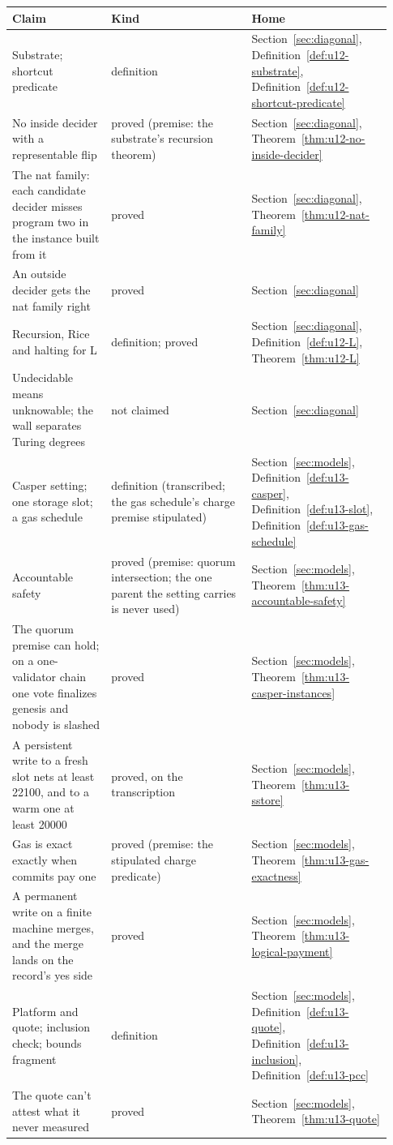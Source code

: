 \documentclass[11pt,twoside]{article}
\theoremstyle{thielethm}
\theoremstyle{thieledef}
\theoremstyle{thieledef}
\theoremstyle{thieledef}
\theoremstyle{thielethm}
\theoremstyle{thieleobs}
\theoremstyle{thielethm}
\begin{document}
\begingroup\small
\begin{longtable}{@{}>{\raggedright\arraybackslash}p{0.242\linewidth}>{\raggedright\arraybackslash}p{0.344\linewidth}>{\raggedright\arraybackslash}p{0.344\linewidth}@{}}
\toprule
\textbf{Claim} & \textbf{Kind} & \textbf{Home} \\
\midrule
\endhead
\bottomrule
\endlastfoot
Substrate; shortcut predicate & definition & Section~\ref{sec:diagonal}, Definition~\ref{def:u12-substrate}, Definition~\ref{def:u12-shortcut-predicate} \\
No inside decider with a representable flip & proved (premise: the substrate's recursion theorem) & Section~\ref{sec:diagonal}, Theorem~\ref{thm:u12-no-inside-decider} \\
The nat family: each candidate decider misses program two in the instance built from it & proved & Section~\ref{sec:diagonal}, Theorem~\ref{thm:u12-nat-family} \\
An outside decider gets the nat family right & proved  & Section~\ref{sec:diagonal} \\
Recursion, Rice and halting for L & definition; proved & Section~\ref{sec:diagonal}, Definition~\ref{def:u12-L}, Theorem~\ref{thm:u12-L} \\
Undecidable means unknowable; the wall separates Turing degrees & not claimed & Section~\ref{sec:diagonal} \\
Casper setting; one storage slot; a gas schedule & definition (transcribed; the gas schedule's charge premise stipulated) & Section~\ref{sec:models}, Definition~\ref{def:u13-casper}, Definition~\ref{def:u13-slot}, Definition~\ref{def:u13-gas-schedule} \\
Accountable safety & proved (premise: quorum intersection; the one parent the setting carries is never used) & Section~\ref{sec:models}, Theorem~\ref{thm:u13-accountable-safety} \\
The quorum premise can hold; on a one-validator chain one vote finalizes genesis and nobody is slashed & proved & Section~\ref{sec:models}, Theorem~\ref{thm:u13-casper-instances} \\
A persistent write to a fresh slot nets at least 22100, and to a warm one at least 20000 & proved, on the transcription & Section~\ref{sec:models}, Theorem~\ref{thm:u13-sstore} \\
Gas is exact exactly when commits pay one & proved (premise: the stipulated charge predicate) & Section~\ref{sec:models}, Theorem~\ref{thm:u13-gas-exactness} \\
A permanent write on a finite machine merges, and the merge lands on the record's yes side & proved & Section~\ref{sec:models}, Theorem~\ref{thm:u13-logical-payment} \\
Platform and quote; inclusion check; bounds fragment & definition & Section~\ref{sec:models}, Definition~\ref{def:u13-quote}, Definition~\ref{def:u13-inclusion}, Definition~\ref{def:u13-pcc} \\
The quote can't attest what it never measured & proved & Section~\ref{sec:models}, Theorem~\ref{thm:u13-quote} \\
\end{longtable}
\endgroup
\end{document}
